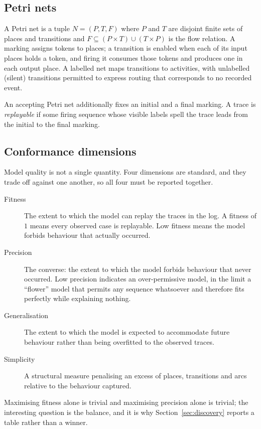 \documentclass[12pt,a4paper]{article}
\begin{document}
\subsection{Petri nets}

A Petri net is a tuple $N = (P, T, F)$ where $P$ and $T$ are disjoint finite
sets of places and transitions and $F \subseteq (P \times T) \cup (T \times P)$
is the flow relation. A marking assigns tokens to places; a transition is
enabled when each of its input places holds a token, and firing it consumes
those tokens and produces one in each output place. A labelled net maps
transitions to activities, with unlabelled (silent) transitions permitted to
express routing that corresponds to no recorded event.

An accepting Petri net additionally fixes an initial and a final marking. A
trace is \emph{replayable} if some firing sequence whose visible labels spell
the trace leads from the initial to the final marking.

\subsection{Conformance dimensions}

Model quality is not a single quantity. Four dimensions are standard, and they
trade off against one another, so all four must be reported together.

\begin{description}
  \item[Fitness] The extent to which the model can replay the traces in the log.
        A fitness of $1$ means every observed case is replayable. Low fitness
        means the model forbids behaviour that actually occurred.
  \item[Precision] The converse: the extent to which the model forbids behaviour
        that never occurred. Low precision indicates an over-permissive model,
        in the limit a ``flower'' model that permits any sequence whatsoever and
        therefore fits perfectly while explaining nothing.
  \item[Generalisation] The extent to which the model is expected to accommodate
        future behaviour rather than being overfitted to the observed traces.
  \item[Simplicity] A structural measure penalising an excess of places,
        transitions and arcs relative to the behaviour captured.
\end{description}

Maximising fitness alone is trivial and maximising precision alone is trivial;
the interesting question is the balance, and it is why
Section~\ref{sec:discovery} reports a table rather than a winner.
\end{document}
